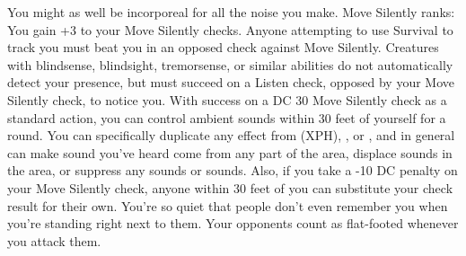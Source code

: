 \skillfeat
{You might as well be incorporeal for all the noise you make.}
{Move Silently ranks:}
{You gain +3 to your Move Silently checks.}
{Anyone attempting to use Survival to track you must beat you in an opposed check against Move Silently.}
{Creatures with blindsense, blindsight, tremorsense, or similar abilities do not automatically detect your presence, but must succeed on a Listen check, opposed by your Move Silently check, to notice you.}
{With success on a DC 30 Move Silently check as a standard action, you can control ambient sounds within 30 feet of yourself for a round. You can specifically duplicate any effect from  (XPH), , or , and in general can make sound you've heard come from any part of the area, displace sounds in the area, or suppress any sounds or sounds. Also, if you take a -10 DC penalty on your Move Silently check, anyone within 30 feet of you can substitute your check result for their own.}
{You're so quiet that people don't even remember you when you're standing right next to them. Your opponents count as flat-footed whenever you attack them.}